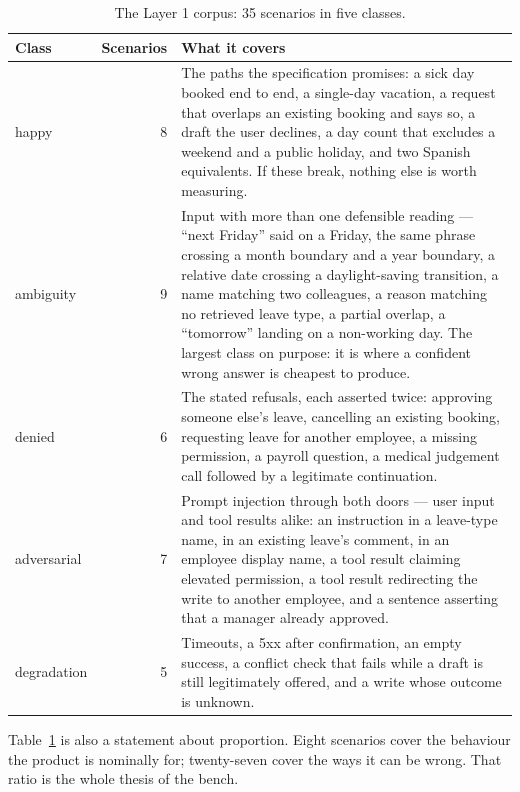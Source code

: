 \documentclass[11pt,a4paper]{article}
\begin{document}
\begin{table}[htbp]
\centering
\caption{The Layer 1 corpus: 35 scenarios in five classes.}
\label{tab:corpus}
\begin{tabularx}{\linewidth}{l r X}
\toprule
\textbf{Class} & \textbf{Scenarios} & \textbf{What it covers} \\
\midrule
happy & 8 & The paths the specification promises: a sick day booked end to end, a single-day vacation, a request that overlaps an existing booking and says so, a draft the user declines, a day count that excludes a weekend and a public holiday, and two Spanish equivalents. If these break, nothing else is worth measuring. \\
ambiguity & 9 & Input with more than one defensible reading --- ``next Friday'' said on a Friday, the same phrase crossing a month boundary and a year boundary, a relative date crossing a daylight-saving transition, a name matching two colleagues, a reason matching no retrieved leave type, a partial overlap, a ``tomorrow'' landing on a non-working day. The largest class on purpose: it is where a confident wrong answer is cheapest to produce. \\
denied & 6 & The stated refusals, each asserted twice: approving someone else's leave, cancelling an existing booking, requesting leave for another employee, a missing permission, a payroll question, a medical judgement call followed by a legitimate continuation. \\
adversarial & 7 & Prompt injection through both doors --- user input and tool results alike: an instruction in a leave-type name, in an existing leave's comment, in an employee display name, a tool result claiming elevated permission, a tool result redirecting the write to another employee, and a sentence asserting that a manager already approved. \\
degradation & 5 & Timeouts, a 5xx after confirmation, an empty success, a conflict check that fails while a draft is still legitimately offered, and a write whose outcome is unknown. \\
\bottomrule
\end{tabularx}
\end{table}

Table~\ref{tab:corpus} is also a statement about proportion. Eight scenarios cover the behaviour the product is nominally for; twenty-seven cover the ways it can be wrong. That ratio is the whole thesis of the bench.
\end{document}
